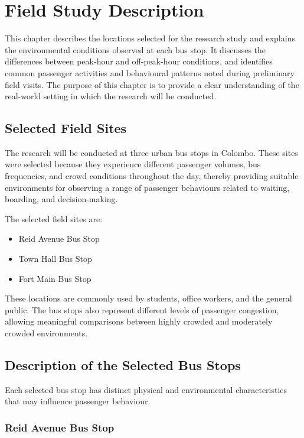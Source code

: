 \documentclass[12pt, a4paper]{report}
\begin{document}
\chapter{Field Study Description}

This chapter describes the locations selected for the research study and explains the
environmental conditions observed at each bus stop. It discusses the differences between
peak-hour and off-peak-hour conditions, and identifies common passenger activities and
behavioural patterns noted during preliminary field visits. The purpose of this chapter is to
provide a clear understanding of the real-world setting in which the research will be
conducted.

\section{Selected Field Sites}

The research will be conducted at three urban bus stops in Colombo. These sites were
selected because they experience different passenger volumes, bus frequencies, and crowd
conditions throughout the day, thereby providing suitable environments for observing a
range of passenger behaviours related to waiting, boarding, and decision-making.

The selected field sites are:

\begin{itemize}[noitemsep]
    \item Reid Avenue Bus Stop
    \item Town Hall Bus Stop
    \item Fort Main Bus Stop
\end{itemize}

These locations are commonly used by students, office workers, and the general public. The
bus stops also represent different levels of passenger congestion, allowing meaningful
comparisons between highly crowded and moderately crowded environments.

\section{Description of the Selected Bus Stops}

Each selected bus stop has distinct physical and environmental characteristics that may
influence passenger behaviour.

\subsection{Reid Avenue Bus Stop}
\end{document}

